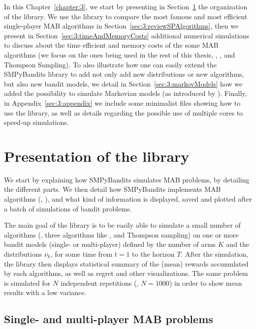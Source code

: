 In this Chapter~\ref{chapter:3}, we start by presenting in Section~\ref{sec:3:presentationLibrary} the organization of the library.
We use the library to compare the most famous and most efficient single-player MAB algorithms in Section~\ref{sec:3:reviewSPAlgorithms},
then we present in Section~\ref{sec:3:timeAndMemoryCosts} additional numerical simulations to discuss about the time efficient and memory costs of the some MAB algorithms (we focus on the ones being used in the rest of this thesis, \UCB, \klUCB, and Thompson Sampling).
To also illustrate how one can easily extend the SMPyBandits library to add not only add new distributions or new algorithms, but also new bandit models, we detail in Section~\ref{sec:3:markovModels} how we added the possibility to simulate Markovian models (as introduced by \cite{Anantharam87b}).
%
Finally, in Appendix~\ref{sec:3:appendix} we include some minimalist files showing how to use the library, as well as details regarding the possible use of multiple cores to speed-up simulations.


\section{Presentation of the library}
\label{sec:3:presentationLibrary}


We start by explaining how SMPyBandits simulates MAB problems, by detailing the different parts.
We then detail how SMPyBandits implements MAB algorithms (\eg, \UCB),
and what kind of information is displayed, saved and plotted after a batch of simulations of bandit problems.

The main goal of the library is to be easily able to simulate a small number of algorithms (\eg, three algorithms like \UCB, \klUCB{} and Thompson sampling) on one or more bandit models (single- or multi-player) defined by the number of arms $K$ and the distributions $\nu_k$, for some time from $t=1$ to the horizon $T$.
After the simulation, the library then displays statistical summary of the (mean) rewards accumulated by each algorithms, as well as regret and other visualizations.
The same problem is simulated for $N$ independent repetitions (\eg, $N=1000$) in order to show mean results with a low variance.


\subsection{Single- and multi-player MAB problems}

